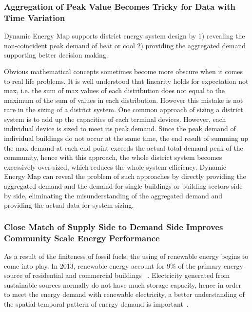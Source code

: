 \documentclass[hidelinks,12pt]{article}
\begin{document}
\subsubsection{Aggregation of Peak Value Becomes Tricky for Data with Time Variation}
Dynamic Energy Map supports district energy system design by 1)
revealing the non-coincident peak demand of heat or cool 2)
providing the aggregated demand supporting better decision making.

Obvious mathematical concepts sometimes become more obscure when it
comes to real life problems. It is well understood that linearity
holds for expectation not max, i.e. the sum of max values of each
distribution does not equal to the maximum of the sum of values in
each distribution. However this mistake is not rare in the sizing of a
district system. One common approach of sizing a district system is to
add up the capacities of each terminal devices. However, each
individual device is sized to meet its peak demand. Since the peak
demand of individual buildings do not occur at the same time, the end
result of summing up the max demand at each end point exceeds the
actual total demand peak of the community, hence with this approach,
the whole district system becomes excessively over-sized, which reduces
the whole system efficiency. Dynamic Energy Map can reveal the problem
of such approaches by directly providing the aggregated demand and the
demand for single buildings or building sectors side by side,
eliminating the misunderstanding of the aggregated demand and
providing the actual data for system sizing.

\begin{comment}
\subsubsection{Temporal Variation in Energy Generation, Storage
    Devices, Price Variation}
The commonly used renewable energy source includes: solar, wind,
geothermal, hydropower and biomass. Among these sources, solar energy
have strong temporal fluctuation as a result of the temporal variation
of solar radiation between different hours of a year and the time of
year~\cite{EIARenewable2015}. 
\end{comment}

\subsubsection{Close Match of Supply Side to Demand Side Improves
  Community Scale Energy Performance}
As a result of the finiteness of fossil fuels, the using of renewable
energy begins to come into play. In 2013, renewable energy account for
9\% of the primary energy source of residential and commercial
buildings ~\cite{EIAPrimary2013}. Electricity generated from
sustainable sources normally do not have much storage capacity, hence
in order to meet the energy demand with renewable electricity, a
better understanding of the spatial-temporal pattern of energy demand
is important~\cite{Mikkola2014256}.
\end{document}
